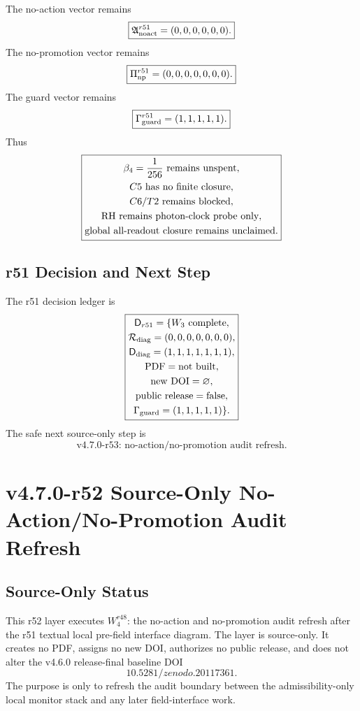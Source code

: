 The no-action vector remains
\[
\boxed{
\mathfrak A_{\rm noact}^{r51}=(0,0,0,0,0,0).
}
\]
The no-promotion vector remains
\[
\boxed{
\Pi_{\rm np}^{r51}=(0,0,0,0,0,0,0).
}
\]
The guard vector remains
\[
\boxed{
\Gamma_{\rm guard}^{r51}=(1,1,1,1,1).
}
\]
Thus
\[
\boxed{
\begin{gathered}
\beta_4={1\over256}\text{ remains unspent},\\
C5\text{ has no finite closure},\\
C6/T2\text{ remains blocked},\\
\mathrm{RH}\text{ remains photon-clock probe only},\\
\text{global all-readout closure remains unclaimed}.
\end{gathered}
}
\]

\subsection{r51 Decision and Next Step}
\label{subsec:r51-decision-next-step}

The r51 decision ledger is
\[
\boxed{
\begin{gathered}
\mathsf D_{r51}
=
\{
W_3\text{ complete},\\
\mathcal R_{\rm diag}=(0,0,0,0,0,0,0),\\
\mathsf D_{\rm diag}=(1,1,1,1,1,1,1),\\
\mathrm{PDF}=\mathrm{not\ built},\\
\mathrm{new\ DOI}=\varnothing,\\
\mathrm{public\ release}=\mathrm{false},\\
\Gamma_{\rm guard}=(1,1,1,1,1)
\}.
\end{gathered}
}
\]
The safe next source-only step is
\[
\boxed{
\text{v4.7.0-r53: no-action/no-promotion audit refresh.}
}
\]



\section{v4.7.0-r52 Source-Only No-Action/No-Promotion Audit Refresh}
\label{sec:r52-no-action-no-promotion-audit-refresh}

\subsection{Source-Only Status}
\label{subsec:r52-source-only-status}

This r52 layer executes \(W_4^{r48}\): the no-action and no-promotion audit refresh after the r51 textual local pre-field interface diagram.  The layer is source-only.  It creates no PDF, assigns no new DOI, authorizes no public release, and does not alter the v4.6.0 release-final baseline DOI
\[
\boxed{10.5281/zenodo.20117361.}
\]
The purpose is only to refresh the audit boundary between the admissibility-only local monitor stack and any later field-interface work.

